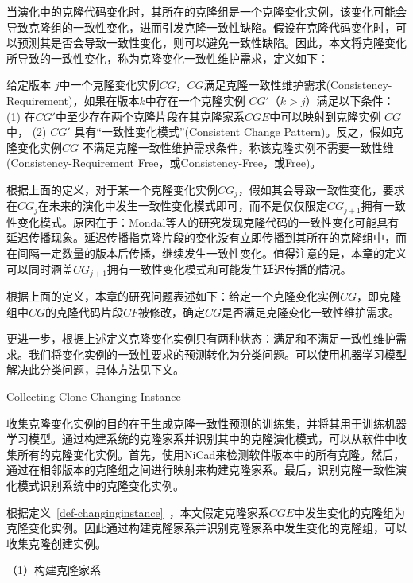 当演化中的克隆代码变化时，其所在的克隆组是一个克隆变化实例，该变化可能会导致克隆组的一致性变化，进而引发克隆一致性缺陷。假设在克隆代码变化时，可以预测其是否会导致一致性变化，则可以避免一致性缺陷。因此，本文将克隆变化所导致的一致性变化，称为克隆变化一致性维护需求，定义如下：

\begin{definition}[克隆变化一致性维护需求] 
 \label{def-changingrequirement}
给定版本 $j$中一个克隆变化实例$CG$，$CG$满足克隆一致性维护需求(Consistency-Requirement)，如果在版本$k$中存在一个克隆实例 $CG'$（$k>j$）满足以下条件： (1) 在$CG'$中至少存在两个克隆片段在其克隆家系$CGE$中可以映射到克隆实例 $CG$中， (2) $CG'$ 具有“一致性变化模式”(Consistent Change Pattern)。反之，假如克隆变化实例$CG$ 不满足克隆一致性维护需求条件，称该克隆实例不需要一致性维(Consistency-Requirement Free，或Consistency-Free，或Free)。
\end{definition}

根据上面的定义，对于某一个克隆变化实例$CG_j$，假如其会导致一致性变化，要求在$CG_j$在未来的演化中发生一致性变化模式即可，而不是仅仅限定$CG_{j+1}$拥有一致性变化模式。原因在于：Mondal等人的研究发现克隆代码的一致性变化可能具有延迟传播现象。延迟传播指克隆片段的变化没有立即传播到其所在的克隆组中，而在间隔一定数量的版本后传播，继续发生一致性变化\cite{mondal2016comparative}。值得注意的是，本章的定义可以同时涵盖$CG_{j+1}$拥有一致性变化模式和可能发生延迟传播的情况。

根据上面的定义，本章的研究问题表述如下：给定一个克隆变化实例$CG$，即克隆组中$CG$的克隆代码片段$CF$被修改，确定$CG$是否满足克隆变化一致性维护需求。

更进一步，根据上述定义克隆变化实例只有两种状态：满足和不满足一致性维护需求。我们将变化实例的一致性要求的预测转化为分类问题。可以使用机器学习模型解决此分类问题，具体方法见下文。

{Collecting Clone Changing Instance}

收集克隆变化实例的目的在于生成克隆一致性预测的训练集，并将其用于训练机器学习模型。通过构建系统的克隆家系并识别其中的克隆演化模式，可以从软件中收集所有的克隆变化实例。首先，使用NiCad来检测软件版本中的所有克隆。然后，通过在相邻版本的克隆组之间进行映射来构建克隆家系。最后，识别克隆一致性演化模式识别系统中的克隆变化实例。

根据定义~\ref{def-changinginstance}~，本文假定克隆家系$CGE$中发生变化的克隆组为克隆变化实例。因此通过构建克隆家系并识别克隆家系中发生变化的克隆组，可以收集克隆创建实例。

（1）构建克隆家系

